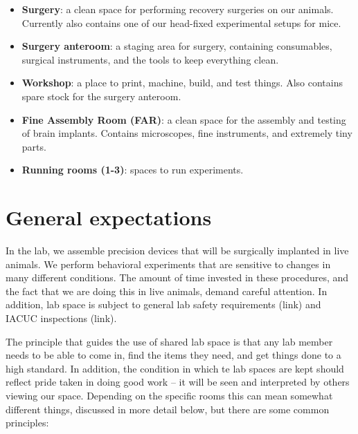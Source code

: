 \documentclass{tufte-book}
\begin{document}
\begin{itemize}
\item{{\bf Surgery}: a clean space for performing recovery surgeries
  on our animals. Currently also contains one of our head-fixed
  experimental setups for mice.}
\item{{\bf Surgery anteroom}: a staging area for surgery, containing
  consumables, surgical instruments, and the tools to keep everything clean.}
\item{{\bf Workshop}: a place to print, machine, build, and test
  things. Also contains spare stock for the surgery anteroom.}
\item{{\bf Fine Assembly Room (FAR)}: a clean space for the assembly
  and testing of brain implants. Contains microscopes, fine
  instruments, and extremely tiny parts.}
\item{{\bf Running rooms (1-3)}: spaces to run experiments.}
\end{itemize}

\section{General expectations}

In the lab, we assemble precision devices that will be surgically
implanted in live animals. We perform behavioral experiments that are
sensitive to changes in many different conditions. The amount of time
invested in these procedures, and the fact that we are doing this in
live animals, demand careful attention. In addition, lab space is
subject to general lab safety requirements (link) and IACUC
inspections (link).

The principle that guides the use of shared lab space is that any lab
member needs to be able to come in, find the items they need, and get
things done to a high standard. In addition, the condition in which te
lab spaces are kept should reflect pride taken in doing good work --
it will be seen and interpreted by others viewing our space.
Depending on the specific rooms this can mean somewhat different
things, discussed in more detail below, but there are some common
principles:
\end{document}
